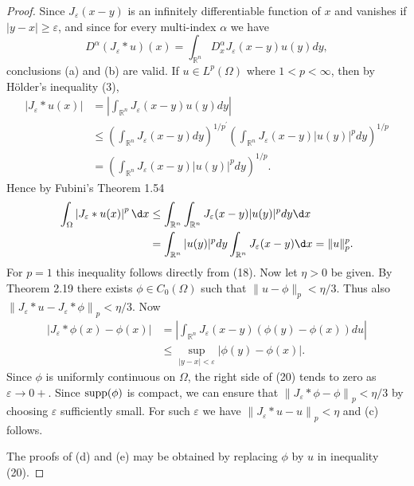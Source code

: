 \begin{proof}
  Since $J_\varepsilon(x-y)$ is an infinitely differentiable function of $x$ and vanishes if $|y-x| \geq \varepsilon$, and since for every multi-index $\alpha$ we have
  \[
  D^\alpha\left(J_\varepsilon * u\right)(x)=\int_{\mathbb{R}^n} D_x^\alpha J_\varepsilon(x-y) u(y) d y,
  \]
  conclusions (a) and (b) are valid.
  If $u \in L^p(\Omega)$ where $1<p<\infty$, then by Hölder's inequality (3),
  \[
  \begin{aligned}
  \left|J_\varepsilon * u(x)\right| & =\left|\int_{\mathbb{R}^n} J_\varepsilon(x-y) u(y) d y\right| \\
  & \leq\left(\int_{\mathbb{R}^n} J_\varepsilon(x-y) d y\right)^{1 / p^{\prime}}\left(\int_{\mathbb{R}^n} J_\varepsilon(x-y)|u(y)|^p d y\right)^{1 / p} \\
  & =\left(\int_{\mathbb{R}^n} J_\varepsilon(x-y)|u(y)|^p d y\right)^{1 / p} .
  \end{aligned}
  \]
  Hence by Fubini's Theorem 1.54
  \[
  \begin{aligned}
  \int_{\Omega}\left|J_\varepsilon * u(x)\right|^p \d x & \leq \int_{\mathbb{R}^n} \int_{\mathbb{R}^n} J_\varepsilon(x-y)|u(y)|^p d y \d x \\
  & =\int_{\mathbb{R}^n}|u(y)|^p d y \int_{\mathbb{R}^n} J_\varepsilon(x-y) \d x=\|u\|_p^p .
  \end{aligned}
  \]
  For $p=1$ this inequality follows directly from (18).
  Now let $\eta>0$ be given. By Theorem 2.19 there exists $\phi \in C_0(\Omega)$ such that $\|u-\phi\|_p<\eta / 3$. Thus also $\left\|J_\varepsilon * u-J_\varepsilon * \phi\right\|_p<\eta / 3$. Now
  \[
  \begin{aligned}
  \left|J_\varepsilon * \phi(x)-\phi(x)\right| & =\left|\int_{\mathbb{R}^n} J_\varepsilon(x-y)(\phi(y)-\phi(x)) d u\right| \\
  & \leq \sup _{|y-x|<\varepsilon}|\phi(y)-\phi(x)| .
  \end{aligned}
  \]
  Since $\phi$ is uniformly continuous on $\Omega$, the right side of (20) tends to zero as $\varepsilon \rightarrow 0+$. Since $\operatorname{supp}(\phi)$ is compact, we can ensure that $\left\|J_\varepsilon * \phi-\phi\right\|_p<\eta / 3$
  by choosing $\varepsilon$ sufficiently small. For such $\varepsilon$ we have $\left\|J_\varepsilon * u-u\right\|_p<\eta$ and (c) follows.
  
  The proofs of (d) and (e) may be obtained by replacing $\phi$ by $u$ in inequality (20).
\end{proof}

